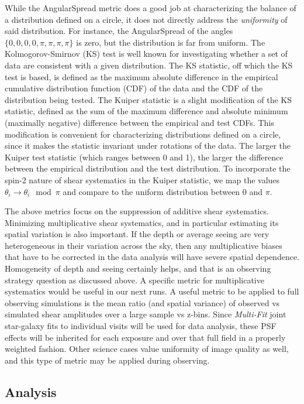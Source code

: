 While the AngularSpread metric does a good job at characterizing the balance of
a distribution defined on a circle, it does not directly address the {\emph
{uniformity}} of said distribution.  For instance, the AngularSpread of the
angles $\{0, 0, 0, 0, \pi, \pi, \pi, \pi\}$ is zero, but the distribution is far
from uniform.  The Kolmogorov-Smirnov (KS) test is well known for investigating
whether a set of data are consistent with a given distribution.  The KS
statistic, off which the KS test is based, is defined as the maximum absolute
difference in the empirical cumulative distribution function (CDF) of the data
and the CDF of the distribution being tested.  The Kuiper statistic is a slight
modification of the KS statistic, defined as the sum of the maximum difference
and absolute minimum (maximally negative) difference between the empirical and
test CDFs.  This modification is convenient for characterizing distributions
defined on a circle, since it makes the statistic invariant under rotations of
the data.  The larger the Kuiper test statistic (which ranges between 0 and 1),
the larger the difference between the empirical distribution and the test
distribution.  To incorporate the spin-2 nature of shear systematics in the
Kuiper statistic, we map the values $\theta_i \rightarrow \theta_i \mod \pi$ and
compare to the uniform distribution between 0 and $\pi$.

The above metrics focus on the suppression of additive shear systematics.
Minimizing multiplicative shear systematics, and in particular estimating its
spatial variation is also important.  If the depth or average seeing are very
heterogeneous in their variation across the sky, then any multiplicative biases
that have to be corrected in the data analysis will have severe spatial
dependence. Homogeneity of depth and seeing certainly helps, and that is an
observing strategy question as discussed above.  A specific metric for
multiplicative systematics would be useful in our next \OpSim runs.  A useful
metric to be applied to full observing simulations is the mean ratio (and
spatial variance) of observed vs simulated shear amplitudes over a large sample
vs z-bins.  Since {\it Multi-Fit} joint star-galaxy fits to individual visits
will be used for data analysis, these PSF effects will be inherited for each
exposure and over that full field in a properly weighted fashion.  Other science
cases value uniformity of image quality as well, and this type of metric may be
applied during observing.


\subsection{\OpSim Analysis}

